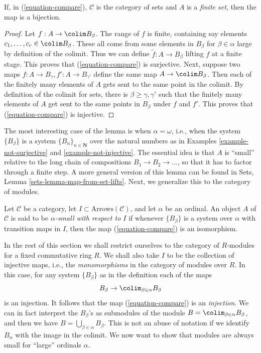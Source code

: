 \begin{lemma}
\label{lemma-out-of-finite}
If, in (\ref{equation-compare}), $\mathcal{C}$ is the category
of sets and $A$ is a {\it finite set}, then the map is a bijection.
\end{lemma}

\begin{proof}
Let $f : A \to \colim B_\beta$.
The range of $f$ is finite, containing say
elements $c_1, \ldots, c_r \in \colim B_\beta$.
These all come from some elements in $B_\beta$ for $\beta \in \alpha$
large by definition of the colimit. Thus we can define
$\widetilde{f} : A \to B_\beta$ lifting $f$ at a finite stage.
This proves that (\ref{equation-compare}) is surjective.
Next, suppose two maps $f : A \to B_\gamma, f' : A \to B_{\gamma'}$
define the same map $A \to \colim B_\beta$.
Then each of the finitely many elements of $A$ gets sent to the same point in
the colimit. By definition of the colimit for sets, there is
$\beta \geq \gamma, \gamma'$ such that the finitely many elements of
$A$ get sent to the same points in $B_\beta$ under $f$ and $f'$.
This proves that (\ref{equation-compare}) is injective.
\end{proof}

\noindent
The most interesting case of the lemma is when $\alpha = \omega$, i.e.,
when the system $\{B_\beta\}$ is a system $\{B_n\}_{n \in \mathbf{N}}$
over the natural numbers as in
Examples \ref{example-not-surjective} and
\ref{example-not-injective}.
The essential idea is that $A$ is ``small'' relative to the long chain of
compositions $B_1 \to B_2 \to \ldots$, so that it has to factor through a
finite step. A more general version of this lemma can be found in
Sets, Lemma \ref{sets-lemma-map-from-set-lifts}.
Next, we generalize this to the category of modules.

\begin{definition}
\label{definition-small}
Let $\mathcal{C}$ be a category, let $I \subset \text{Arrows}(\mathcal{C})$,
and let $\alpha$ be an ordinal. An object $A$ of $\mathcal{C}$ is said to
be {\it $\alpha$-small with respect to $I$} if whenever $\{B_\beta\}$ is
a system over $\alpha$ with transition maps in $I$, then
the map (\ref{equation-compare}) is an isomorphism.
\end{definition}

\noindent
In the rest of this section we shall restrict ourselves
to the category of $R$-modules for a fixed commutative ring $R$.
We shall also take $I$ to be the collection of injective maps, i.e., the
{\it monomorphisms} in the category of modules over $R$. In this case, for
any system $\{B_\beta\}$ as in the definition each of the maps
$$
B_\beta \to \colim_{\beta \in \alpha} B_\beta
$$
is an injection. It follows that the map (\ref{equation-compare}) is an
{\it injection}. We can in fact interpret the $B_\beta$'s as submodules
of the module $B = \colim_{\beta \in \alpha} B_\beta$, and then we
have $B = \bigcup_{\beta \in \alpha} B_\beta$. This is not an abuse of
notation if we identify $B_\alpha$ with the image in the colimit.
We now want to show that modules are always small for ``large'' ordinals
$\alpha$.

